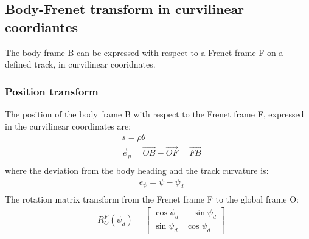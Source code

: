\documentclass[12pt]{article}
\begin{document}
            \newpage


    



    \subsection{Body-Frenet transform in curvilinear coordiantes}
        The body frame B can be expressed with respect to a Frenet frame F
        on a defined track, in curvilinear cooridnates.

        \subsubsection{Position transform}
            The position of the body frame B with respect to the Frenet frame F,
            expressed in the curvilinear coordinates are:
            \begin{equation}
                \begin{aligned}
                    & s = \rho \theta \\
                    & \vec{e}_y = \vec{OB} - \vec{OF} = \vec{FB} \\
                \end{aligned}
            \end{equation}
            where the deviation from the body heading and the track curvature is:
            \begin{equation}
                \begin{aligned}
                    & e_{\psi} = \psi - \psi_d \\
                \end{aligned}
            \end{equation}
            The rotation matrix transform from the Frenet frame F to the global frame O:
            \begin{equation}
                \begin{aligned}
                    & R^F_O(\psi_d) = 
                    \begin{bmatrix} \cos{\psi_d} & -\sin{\psi_d} \\ \sin{\psi_d} & \cos{\psi_d} \end{bmatrix} \\
                \end{aligned}
            \end{equation}
\end{document}

